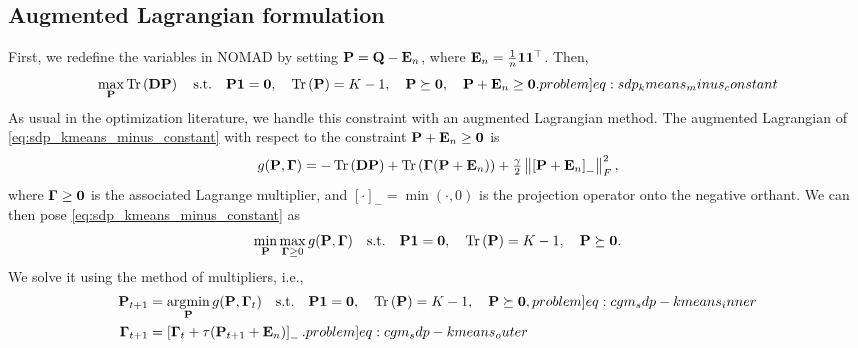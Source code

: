 \documentclass[twoside,11pt]{article}
\begin{document}
\subsection{Augmented Lagrangian formulation}
First, we redefine the variables in NOMAD by setting ${\mathbf{P}} = {\mathbf{Q}} - {\mathbf{E}}_n$, where ${\mathbf{E}}_n = \tfrac{1}{n} {\mathbf{1}} {{\mathbf{1}}}^\top$. Then,
\begin{equation}
	\max_{\mat{P}}
	\traceone{\mat{D} \mat{P}}
	\quad\text{s.t.}\quad
	\mat{P} \vect{1} = \vect{0} ,
    \quad
	\traceone{\mat{P}} = K - 1 ,
    \quad
	\mat{P} \succeq \mat{0} ,
    \quad
	\mat{P} + \mat{E}_n \geq \mat{0} .
	\label[problem]{eq:sdp_kmeans_minus_constant}
\end{equation}
As usual in the optimization literature, we handle this constraint with an augmented Lagrangian method. The augmented Lagrangian of \cref{eq:sdp_kmeans_minus_constant} with respect to the constraint ${\mathbf{P}} + {\mathbf{E}}_n \geq {\mathbf{0}}$ is
\begin{equation}
	g({\mathbf{P}}, {\mathbf{\Gamma}}) =
    - \operatorname{Tr}\left({\mathbf{D}} {\mathbf{P}}\right)
    + \operatorname{Tr}\left({\mathbf{\Gamma}} ( {\mathbf{P}} + {\mathbf{E}}_n )\right)
    + \tfrac{\gamma}{2} \left\| \left[ {\mathbf{P}} + {\mathbf{E}}_n \right]_{-}  \right\|_{F}^2 ,
	\label{eq:sdp_kmeans_minus_constant_lagrangian}
\end{equation}
where ${\mathbf{\Gamma}} \geq {\mathbf{0}}$ is the associated Lagrange multiplier, and $[\cdot]_{-} = \min(\cdot, 0)$ is the projection operator onto the negative orthant.
We can then pose \cref{eq:sdp_kmeans_minus_constant} as
\begin{equation}
	\min_{{\mathbf{P}}}
    \max_{{\mathbf{\Gamma}} \geq 0}
	g({\mathbf{P}}, {\mathbf{\Gamma}})
    \quad\text{s.t.}\quad
	{\mathbf{P}} {\mathbf{1}} = {\mathbf{0}} ,
    \quad
	\operatorname{Tr}\left({\mathbf{P}}\right) = K - 1 ,
    \quad
	{\mathbf{P}} \succeq {\mathbf{0}} .
    \label{eq:maxmin_sdp-km}
\end{equation}
We solve it using the method of multipliers, i.e.,
\begin{subequations}
\begin{align}
	\mat{P}_{t+1} &= \argmin_{\mat{P}}
	g(\mat{P}, \mat{\Gamma}_{t})
	\quad\text{s.t.}\quad
    	\mat{P} \vect{1} = \vect{0} ,
    \quad
	\traceone{\mat{P}} = K - 1 ,
    \quad
	\mat{P} \succeq \mat{0} ,
	\label[problem]{eq:cgm_sdp-kmeans_inner} \\
    \mat{\Gamma}_{t+1} &= \left[ \mat{\Gamma}_t + \tau ( \mat{P}_{t+1} + \mat{E}_n ) \right]_{-} .
    \label[problem]{eq:cgm_sdp-kmeans_outer}
\end{align}
\end{subequations}
\end{document}
